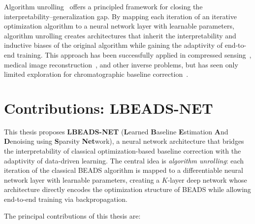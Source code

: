 Algorithm unrolling~\cite{gregor2010lista, monga2021unrolling} offers a principled framework for closing the interpretability--generalization gap. By mapping each iteration of an iterative optimization algorithm to a neural network layer with learnable parameters, algorithm unrolling creates architectures that inherit the interpretability and inductive biases of the original algorithm while gaining the adaptivity of end-to-end training. This approach has been successfully applied in compressed sensing~\cite{zhang2018istanet}, medical image reconstruction~\cite{yang2018admm}, and other inverse problems, but has seen only limited exploration for chromatographic baseline correction~\cite{gharbi2024unrolled}.


\section{Contributions: LBEADS-NET}
\label{sec:intro_contributions}

This thesis proposes \textbf{LBEADS-NET} (\textbf{L}earned \textbf{B}aseline \textbf{E}stimation \textbf{A}nd \textbf{D}enoising using \textbf{S}parsity \textbf{Net}work), a neural network architecture that bridges the interpretability of classical optimization-based baseline correction with the adaptivity of data-driven learning. The central idea is \emph{algorithm unrolling}: each iteration of the classical BEADS algorithm is mapped to a differentiable neural network layer with learnable parameters, creating a $K$-layer deep network whose architecture directly encodes the optimization structure of BEADS while allowing end-to-end training via backpropagation.

The principal contributions of this thesis are:

